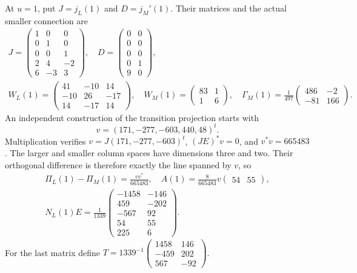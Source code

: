 \documentclass[11pt]{article}
\begin{document}
At $u=1$, put $J=j_L(1)$ and $D=j_M'(1)$. Their matrices and
the actual smaller connection are
\[
 \begin{gathered}
 J=\begin{pmatrix}1&0&0\\0&1&0\\0&0&1\\2&4&-2\\6&-3&3\end{pmatrix},\quad
 D=\begin{pmatrix}0&0\\0&0\\0&0\\0&1\\9&0\end{pmatrix},\\
 W_L(1)=\begin{pmatrix}41&-10&14\\-10&26&-17\\14&-17&14\end{pmatrix},\quad
 W_M(1)=\begin{pmatrix}83&1\\1&6\end{pmatrix},\quad
 \Gamma_M(1)=\frac1{497}\begin{pmatrix}486&-2\\-81&166\end{pmatrix}.
 \end{gathered}
 \tag{NT.33}
\]
An independent construction of the transition projection starts with
\[v=(171,-277,-603,440,48)^t.\]
Multiplication verifies
$v=J(171,-277,-603)^t$, $(JE)^*v=0$, and $v^*v=665483$.
The larger and smaller column spaces have dimensions three and two.
Their orthogonal difference is therefore exactly the line spanned
by $v$, so
\[
 \begin{gathered}
 \Pi_L(1)-\Pi_M(1)=\frac{vv^*}{665483},\quad
 A(1)=\frac8{665483}v\begin{pmatrix}54&55\end{pmatrix},\\
 N_L(1)E=\frac1{1339}
 \begin{pmatrix}-1458&-146\\459&-202\\-567&92\\54&55\\225&6\end{pmatrix}.
 \end{gathered}
 \tag{NT.34}
\]
For the last matrix define
$T=1339^{-1}\left(\begin{smallmatrix}1458&146\\-459&202\\567&-92\end{smallmatrix}\right)$.
\end{document}

